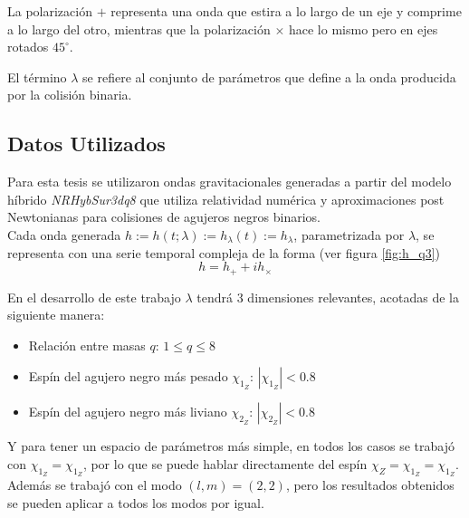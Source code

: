 La polarización $+$ representa una onda que estira a lo largo de un eje y comprime a lo largo del otro, mientras que la polarización $\times$ hace lo mismo pero en ejes rotados $45^{\circ}$.

El término $\lambda$ se refiere al conjunto de parámetros que define a la onda producida por la colisión binaria.


\subsection*{Datos Utilizados}

Para esta tesis se utilizaron ondas gravitacionales generadas a partir del modelo híbrido \textit{NRHybSur3dq8}\cite{Varma_2019} que utiliza relatividad numérica y aproximaciones post Newtonianas para colisiones de agujeros negros binarios.
\\

Cada onda generada \( h := h(t; \lambda) := h_{\lambda}(t) := h_{\lambda} \), parametrizada por $\lambda$, se representa con una serie temporal compleja de la forma (ver figura \ref{fig:h_q3})
\[
h = h_+ + ih_{\times}
\]

En el desarrollo de este trabajo \(\lambda\) tendrá 3 dimensiones relevantes, acotadas de la siguiente manera:

\begin{itemize}
\item Relación entre masas $q$: $1 \le q \le 8$
\item Espín del agujero negro más pesado $\chi_{1_Z}$: $|\chi_{1_Z}| < 0.8$
\item Espín del agujero negro más liviano $\chi_{2_Z}$: $|\chi_{2_Z}| < 0.8$
\end{itemize}

Y para tener un espacio de parámetros más simple, en todos los casos se trabajó con $\chi_{1_Z} = \chi_{1_Z}$, por lo que se puede hablar directamente del espín $\chi_{Z}=\chi_{1_Z} = \chi_{1_Z}$. Además se trabajó con el modo $(l, m) =(2, 2)$, pero los resultados obtenidos se pueden aplicar a todos los modos por igual.

